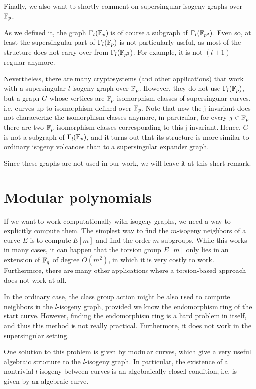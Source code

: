 Finally, we also want to shortly comment on supersingular isogeny graphs over $\mathbb{F}_p$.
\begin{remark}
    As we defined it, the graph $\Gamma_l(\mathbb{F}_p)$ is of course a subgraph of $\Gamma_l(\mathbb{F}_{p^2})$.
    Even so, at least the supersingular part of $\Gamma_l(\mathbb{F}_p)$ is not particularly useful, as most of the structure does not carry over from $\Gamma_l(\mathbb{F}_{p^2})$.
    For example, it is not $(l + 1)$-regular anymore.

    Nevertheless, there are many cryptosystems (and other applications) that work with a supersingular $l$-isogeny graph over $\mathbb{F}_p$.
    However, they do not use $\Gamma_l(\mathbb{F}_p)$, but a graph $G$ whose vertices are $\mathbb{F}_p$-isomorphism classes of supersingular curves, i.e. curves up to isomorphism defined over $\mathbb{F}_p$.
    Note that now the j-invariant does not characterize the isomorphism classes anymore, in particular, for every $j \in \mathbb{F}_p$ there are two $\mathbb{F}_p$-isomorphism classes corresponding to this j-invariant.
    Hence, $G$ is not a subgraph of $\Gamma_l(\mathbb{F}_p)$, and it turns out that its structure is more similar to ordinary isogeny volcanoes than to a supersingular expander graph.
\end{remark}
Since these graphs are not used in our work, we will leave it at this short remark.

\section{Modular polynomials}
If we want to work computationally with isogeny graphs, we need a way to explicitly compute them.
The simplest way to find the $m$-isogeny neighbors of a curve $E$ is to compute $E[m]$ and find the order-$m$-subgroups.
While this works in many cases, it can happen that the torsion group $E[m]$ only lies in an extension of $\mathbb{F}_q$ of degree $O(m^2)$, in which it is very costly to work.
Furthermore, there are many other applications where a torsion-based approach does not work at all.

In the ordinary case, the class group action might be also used to compute neighbors in the $l$-isogeny graph, provided we know the endomorphism ring of the start curve.
However, finding the endomorphism ring is a hard problem in itself, and thus this method is not really practical.
Furthermore, it does not work in the supersingular setting.

One solution to this problem is given by modular curves, which give a very useful algebraic structure to the $l$-isogeny graph.
In particular, the existence of a nontrivial $l$-isogeny between curves is an algebraically closed condition, i.e. is given by an algebraic curve.

